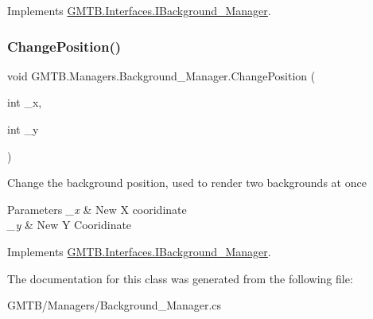 Implements \mbox{\hyperlink{interface_g_m_t_b_1_1_interfaces_1_1_i_background___manager}{G\+M\+T\+B.\+Interfaces.\+I\+Background\+\_\+\+Manager}}.

\mbox{\label{class_g_m_t_b_1_1_managers_1_1_background___manager_a3e050e37529783f5fea2fb2f8a0e893c}} 
\subsubsection{\texorpdfstring{ChangePosition()}{ChangePosition()}}
{\footnotesize\ttfamily void G\+M\+T\+B.\+Managers.\+Background\+\_\+\+Manager.\+Change\+Position (\begin{DoxyParamCaption}\item[{int}]{\+\_\+x,  }\item[{int}]{\+\_\+y }\end{DoxyParamCaption})}



Change the background position, used to render two backgrounds at once 


\begin{DoxyParams}{Parameters}
{\em \+\_\+x} & New X cooridinate \\
\hline
{\em \+\_\+y} & New Y Cooridinate \\
\hline
\end{DoxyParams}


Implements \mbox{\hyperlink{interface_g_m_t_b_1_1_interfaces_1_1_i_background___manager}{G\+M\+T\+B.\+Interfaces.\+I\+Background\+\_\+\+Manager}}.



The documentation for this class was generated from the following file\+:\begin{DoxyCompactItemize}
\item 
G\+M\+T\+B/\+Managers/Background\+\_\+\+Manager.\+cs\end{DoxyCompactItemize}
